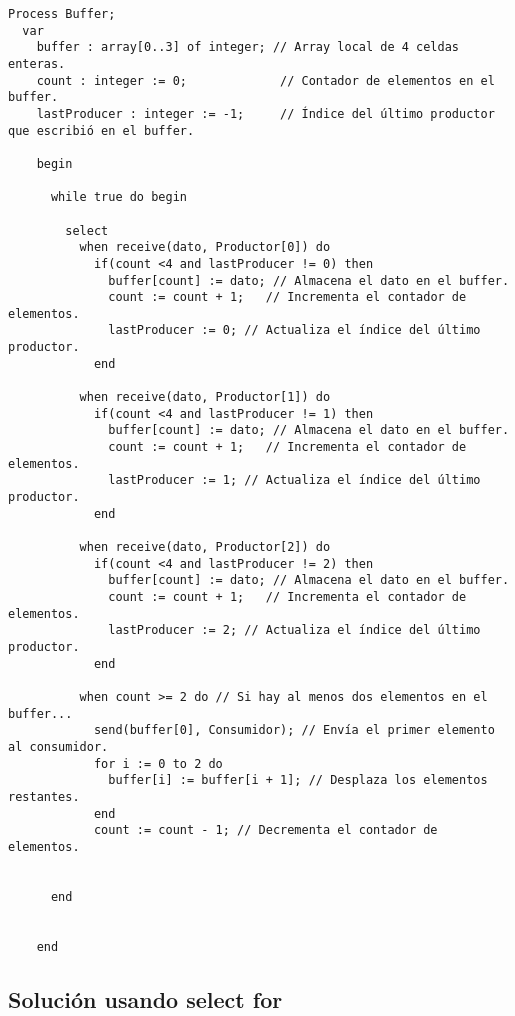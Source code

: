 \documentclass[a4paper,12pt]{article}
\begin{document}
\begin{lstlisting}[style=customcpp, caption={Pseudocódigo del proceso Buffer}]
  Process Buffer;
  var
    buffer : array[0..3] of integer; // Array local de 4 celdas enteras.
    count : integer := 0;             // Contador de elementos en el buffer.
    lastProducer : integer := -1;     // Índice del último productor que escribió en el buffer.

    begin
    
      while true do begin

        select
          when receive(dato, Productor[0]) do 
            if(count <4 and lastProducer != 0) then
              buffer[count] := dato; // Almacena el dato en el buffer.
              count := count + 1;   // Incrementa el contador de elementos.
              lastProducer := 0; // Actualiza el índice del último productor.
            end
          
          when receive(dato, Productor[1]) do
            if(count <4 and lastProducer != 1) then
              buffer[count] := dato; // Almacena el dato en el buffer.
              count := count + 1;   // Incrementa el contador de elementos.
              lastProducer := 1; // Actualiza el índice del último productor.
            end
          
          when receive(dato, Productor[2]) do
            if(count <4 and lastProducer != 2) then
              buffer[count] := dato; // Almacena el dato en el buffer.
              count := count + 1;   // Incrementa el contador de elementos.
              lastProducer := 2; // Actualiza el índice del último productor.
            end
          
          when count >= 2 do // Si hay al menos dos elementos en el buffer...
            send(buffer[0], Consumidor); // Envía el primer elemento al consumidor.
            for i := 0 to 2 do
              buffer[i] := buffer[i + 1]; // Desplaza los elementos restantes.
            end
            count := count - 1; // Decrementa el contador de elementos.
              

      end
    
    
    end
\end{lstlisting}


\subsection{Solución usando select for}
\end{document}
